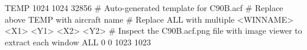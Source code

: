 TEMP 1024 1024 32856
# Auto-generated template for C90B.acf
# Replace above TEMP with aircraft name
# Replace ALL with multiple <WINNAME> <X1> <Y1> <X2> <Y2>
# Inspect the C90B.acf.png file with image viewer to extract each window
ALL 0 0 1023 1023
